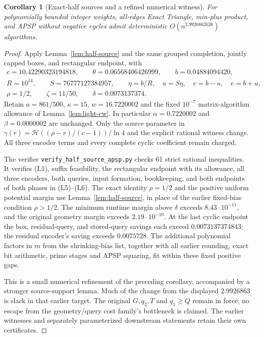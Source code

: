 \documentclass[11pt]{article}
\newtheorem{corollary}[theorem]{Corollary}
\newcommand{\HH}{\mathcal H}
\begin{document}
\begin{corollary}[Exact-half sources and a refined numerical witness]
\label{cor:half-source-apsp}
For polynomially bounded integer weights, all-edges Exact Triangle,
min-plus product, and APSP without negative cycles admit deterministic
$O(n^{2.9926862626})$ algorithms.
\end{corollary}
\begin{proof}
Apply Lemma~\ref{lem:half-source} and the same grouped completion,
jointly capped boxes, and rectangular endpoint, with
\[
\begin{gathered}
 c=10.42290323194818,\qquad\theta=0.06568406426999,\qquad
 b=0.04884094420,\\
 R=10^{14},\qquad S=76777127384957,\qquad
 \eta=b/R,\quad u=S\eta,\quad v=b-u,\quad e=b+u,\\
 \rho=1/2,\qquad \zeta=11/50,\qquad \delta=0.0073137374.
\end{gathered}
\]
Retain $a=861/500$, $\kappa=15$, $w=16.7220002$ and the fixed
$10^{-7}$ matrix-algorithm allowance of Lemma~\ref{lem:light-cw}.
In particular $\alpha=0.7220002$ and $\beta=0.0000002$ are unchanged.
Only the source parameter in
$\gamma(r)=\HH((\rho-r)/(c-1))/\ln4$ and the explicit rational
witness change. All three encoder terms and every complete cyclic
coefficient remain charged.

The verifier \texttt{verify\_half\_source\_apsp.py} checks 61 strict
rational inequalities. It verifies (L1), suffix feasibility, the
rectangular endpoint with its allowance, all three encoders, both
queries, input formation, bookkeeping, and both endpoints of
both phases in (L5)--(L6). The exact identity $\rho=1/2$ and the
positive uniform potential margin use Lemma~\ref{lem:half-source},
in place of the earlier fixed-bias condition $\rho>1/2$.
The minimum runtime margin above $\delta$ exceeds $8.43\cdot10^{-11}$,
and the original geometry margin exceeds $2.19\cdot10^{-10}$.
At the last cyclic endpoint the box, residual-query, and stored-query
savings each exceed $0.0073137374843$; the residual encoder's saving
exceeds $0.0075728$. The additional polynomial factors in $m$ from
the shrinking-bias list, together with all earlier rounding, exact
bit arithmetic, prime stages and APSP squaring, fit within these
fixed positive gaps.

This is a small numerical refinement of the preceding corollary,
accompanied by a stronger source-support lemma. Much of the change
from the displayed $2.9926863$ is slack in that earlier target.
The original $G,q_2,T$ and $q_1\ge Q$ remain in force; no escape
from the geometry/query cost family's bottleneck is claimed.
The earlier witnesses and separately parameterized downstream
statements retain their own certificates.
\end{proof}
\end{document}
